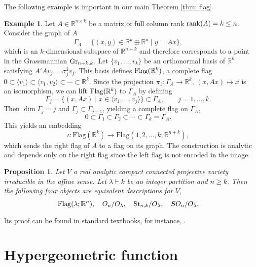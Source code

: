 \documentclass{amsart}
\newtheorem{proposition}[theorem]{Proposition}
\theoremstyle{definition}
\newtheorem{example}[theorem]{Example}
\numberwithin{equation}{section}
\begin{document}
The following example is important in our main Theorem \ref{thm: flag}.
\begin{example}
Let $A \in \mathbb{R}^{n \times k}$ be a matrix of full column rank ${\rm rank}(A) = k \le n$. Consider the graph of $A$
\[
\Gamma_A = \{ (x, y) \in \mathbb{R}^k \oplus \mathbb{R}^n \mid y = Ax \},
\]
which is an $k$-dimensional subspace of $\mathbb{R}^{n+k}$ and therefore corresponds to a point in the Grassmannian ${\rm Gr}_{n+k,k}$. Let $\{v_1, \dots, v_k\}$ be an orthonormal basis of $\mathbb{R}^k$ satisfying $A'Av_j = \sigma^2_j v_j$. This basis defines ${\rm Flag}(\mathbb R^k)$, a complete flag $0 \subset \langle v_1 \rangle \subset \langle v_1, v_2 \rangle \subset \cdots \subset \mathbb{R}^k$. Since the projection $\pi_1: \Gamma_A \to \mathbb{R}^k$, $(x, Ax) \mapsto x$ is an isomorphism, we can lift ${\rm Flag}(\mathbb R^k)$ to $\Gamma_A$ by defining
\[
\Gamma_j = \{ (x, Ax) \mid x \in \langle v_1, \dots, v_j \rangle \} \subset \Gamma_A, \qquad j = 1, \dots, k.
\]
Then $\dim \Gamma_j = j$ and $\Gamma_j \subset \Gamma_{j+1}$, yielding a complete flag on $\Gamma_A$,
\[
0 \subset \Gamma_1 \subset \Gamma_2 \subset \cdots \subset \Gamma_k = \Gamma_A.
\]
This yields an embedding
\[
\iota: \mathrm{Flag}(\mathbb{R}^k) \rightarrow \mathrm{Flag}(1,2,\dots,k; \mathbb{R}^{n+k}),
\]
which sends the right flag of $A$ to a flag on its graph. The construction is analytic and depends only on the right flag since the left flag is not encoded in the image.
\end{example}

\begin{proposition}
    Let $V$ a real analytic compact connected projective variety irreducible in the affine sense. Let $\lambda \vdash k$ be an integer partition and $n \ge k$. Then the following four objects are equivalent descriptions for $V$,
    $$\mathrm{Flag}(\lambda; \mathbb{R}^n), \quad O_n/O_\lambda, \quad {\rm St}_{n,k}/O_\lambda, \quad  SO_n/O_\lambda.$$
\end{proposition}
Its proof can be found in standard textbooks, for instance, \cite{fulton1997young,lakshmibai2001flag,goodman2009gtm255}.


\section{Hypergeometric function}
\end{document}
